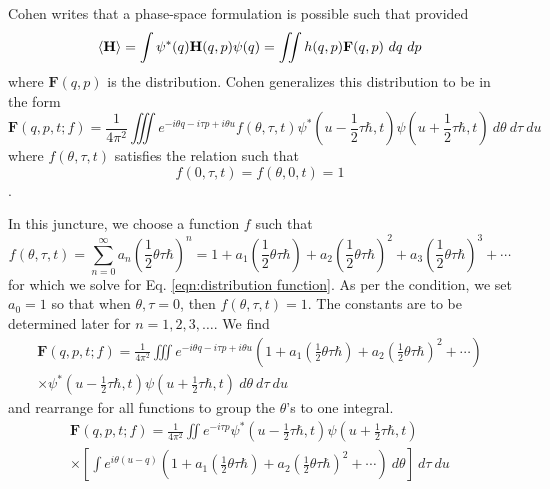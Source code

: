 \documentclass[a4paper]{article}
\begin{document}
	Cohen writes that a phase-space formulation is possible such that provided 
	\begin{equation}
		\Braket{\textbf{H}}=\int \psi^*(q)\textbf{H}(q,p)\psi(q)=\iint h(q,p)\textbf{F}(q,p)~dq~dp
	\end{equation}
	where $\textbf{F}(q,p)$ is the distribution. Cohen generalizes this distribution to be in the form
	\begin{equation}\label{eqn:distribution function}
		\textbf{F}(q,p,t;f)=\frac{1}{4\pi^2}\iiint e^{-i\theta q-i\tau p+i\theta u}f(\theta,\tau,t)\psi^*\left(u-\frac{1}{2}\tau\hbar,t\right)\psi\left(u+\frac{1}{2}\tau\hbar,t\right)~d\theta~d\tau~du
	\end{equation}
	where $f(\theta,\tau,t)$ satisfies the relation such that
	\begin{equation}
		f(0,\tau,t)=f(\theta,0,t)=1
	\end{equation}.
	
	In this juncture, we choose a function $f$ such that
	\begin{equation}
		f(\theta,\tau,t)=\sum_{n=0}^\infty a_n\left(\frac{1}{2}\theta\tau\hbar\right)^n=1+a_1\left(\frac{1}{2}\theta\tau\hbar\right)+a_2\left(\frac{1}{2}\theta\tau\hbar\right)^2+a_3\left(\frac{1}{2}\theta\tau\hbar\right)^3+\cdots
	\end{equation}
	for which we solve for Eq. \ref{eqn:distribution function}. As per the condition, we set $a_0=1$ so that when $\theta,\tau=0$, then $f(\theta,\tau,t)=1$. The constants are to be determined later for $n=1,2,3,\ldots$. We find
	\begin{multline}
		\textbf{F}(q,p,t;f)=\frac{1}{4\pi^2}\iiint e^{-i\theta q-i\tau p+i\theta u}\left(1+a_1\left(\frac{1}{2}\theta\tau\hbar\right)+a_2\left(\frac{1}{2}\theta\tau\hbar\right)^2+\cdots\right)\\\times\psi^*\left(u-\frac{1}{2}\tau\hbar,t\right)\psi\left(u+\frac{1}{2}\tau\hbar,t\right)~d\theta~d\tau~du
	\end{multline}
	and rearrange for all functions to group the $\theta$'s to one integral.
	\begin{multline}
		\textbf{F}(q,p,t;f)=\frac{1}{4\pi^2}\iint e^{-i\tau p}\psi^*\left(u-\frac{1}{2}\tau\hbar,t\right)\psi\left(u+\frac{1}{2}\tau\hbar,t\right)\\\times\left[\int e^{i\theta(u-q)}\left(1+a_1\left(\frac{1}{2}\theta\tau\hbar\right)+a_2\left(\frac{1}{2}\theta\tau\hbar\right)^2+\cdots\right)~d\theta\right]~d\tau~du
	\end{multline}
	
\end{document}
